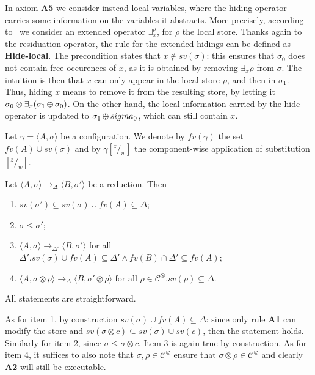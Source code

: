 \documentclass{llncs}
\def\C{{\mathcal C}}
\def\C{{\mathcal C}}
\def\odiv{\, {\ominus\hspace{-7.7pt} \div} \,}
\begin{document}
In axiom {\bf A5} we consider instead local variables, where the hiding operator carries some information on the variables it abstracts.
More precisely, according to~\cite{extendedHiding} we consider an extended operator $\exists_x^\rho$, for $\rho$ the local store.
Thanks again to the residuation operator, the rule for the extended hidings can be defined as {\bf Hide-local}. The precondition states that $x \not \in sv(\sigma)$: this ensures that $\sigma_0$ does not contain free occurences of $x$, as it is obtained by removing $\exists_x \rho$ from $\sigma$. The intuition is then that $x$ can only appear in the local store $\rho$, and then in $\sigma_1$. Thus, hiding $x$ means to remove it from the resulting store, by letting it $\sigma_0 \otimes \exists_x(\sigma_1 \odiv \sigma_0)$. On the other hand, the local information carried by the hide operator is updated to $\sigma_1 \odiv sigma_0$, which can still contain $x$. \\
\smallskip

Let $\gamma = \langle A, \sigma \rangle$ be a configuration.
%
We denote by $fv(\gamma)$ the set $fv(A) \cup sv(\sigma)$ and by
$\gamma[^z/_w]$ the component-wise application of substitution $[^z/_w]$.

\begin{lemma}[On monotonicity]
\label{mono}
Let $\langle A, \sigma \rangle \rightarrow_\Delta \langle B, \sigma' \rangle$ be a reduction. 
Then
\begin{enumerate}
\item $sv(\sigma') \subseteq sv(\sigma)\cup fv(A) \subseteq \Delta$;
\item $\sigma \leq \sigma'$;
\item $\langle A, \sigma \rangle \rightarrow_{\Delta'} \langle B, \sigma' \rangle$
         for all $\Delta'. sv(\sigma)\cup fv(A) \subseteq \Delta' \wedge fv(B) \cap \Delta' \subseteq fv(A)$;
\item $\langle A, \sigma \otimes \rho \rangle \rightarrow_\Delta \langle B, \sigma' \otimes \rho \rangle$
         for all $\rho \in  \C^\otimes. sv(\rho) \subseteq \Delta$. 
\end{enumerate}
 \end{lemma}
 
 All statements are straightforward. 

As for item 1, by construction $sv(\sigma)\cup fv(A) \subseteq \Delta$: since 
only rule {\bf A1} can modify the store
and $sv(\sigma \otimes c) \subseteq sv(\sigma) \cup sv(c)$, then the statement holds.
Similarly for item 2, since $\sigma \leq \sigma \otimes c$.
Item 3 is again true by construction. 
As for item 4, it suffices to also note that 
$\sigma, \rho \in  \C^\otimes$ ensure that $\sigma \otimes \rho \in  \C^\otimes$
and clearly {\bf A2} will still be executable. 
\end{document}
